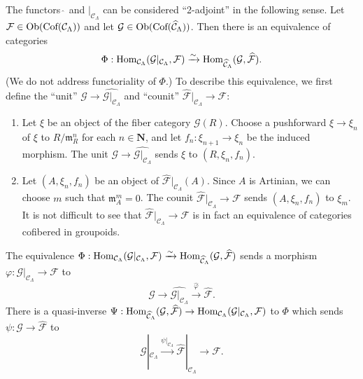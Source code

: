 \begin{remark}
\medskip \noindent
The functors $\widehat{~}$ and $|_{\mathcal C_{\Lambda}}$ can be considered 
``2-adjoint'' in the following sense.  Let $\mathcal F \in 
\textnormal{Ob}(\textnormal{Cof}(\mathcal C_{\Lambda}))$ and let $\mathcal G 
\in \textnormal{Ob}(\textnormal{Cof}(\widehat{\mathcal C}_{\Lambda}))$.  Then 
there is an equivalence of categories
\[ 
\Phi: \textnormal{Hom}_{\mathcal C_{\Lambda}}(\mathcal G|_{\mathcal 
C_{\Lambda}}, \mathcal F) 
\xrightarrow{\sim} 
\textnormal{Hom}_{\widehat{\mathcal C}_{\Lambda}}(\mathcal G, \widehat{\mathcal 
F}) .
\]
(We do not address functoriality of $\Phi$.) To describe this equivalence, we 
first define the ``unit'' $\mathcal G \rightarrow \widehat{\mathcal 
G|_{\mathcal C_{\Lambda}}}$ and ``counit'' $\widehat{\mathcal F}|_{\mathcal 
C_{\Lambda}} \rightarrow \mathcal F$:
\begin{enumerate}
\item Let $\xi$ be an object of the fiber category $\mathcal G(R)$.  Choose a 
pushforward $\xi \rightarrow \xi_{n}$ of $\xi$ to $R/\mathfrak{m}_{R}^{n}$ for 
each $n \in \mathbf{N}$, and let $f_{n}: \xi_{n+1} \rightarrow \xi_{n}$ be the 
induced morphism.  The unit $\mathcal G \rightarrow \widehat{\mathcal 
G|_{\mathcal C_{\Lambda}}}$ sends $\xi$ to $(R,\xi_{n},f_{n})$.  
\item Let $(A,\xi_n,f_n)$ be an object of $\widehat{\mathcal F}|_{\mathcal 
C_{\Lambda}}(A)$. Since $A$ is Artinian, we can choose $m$ such that 
$\mathfrak{m}_{A}^{m} = 0$.  The counit $\widehat{\mathcal F}|_{\mathcal 
C_{\Lambda}} \rightarrow \mathcal F$ sends $(A,\xi_n,f_n)$ to $\xi_{m}$.  It is 
not difficult to see that $\widehat{\mathcal F}|_{\mathcal C_{\Lambda}} 
\rightarrow \mathcal F$ is in fact an equivalence of categories cofibered in 
groupoids.
\end{enumerate}
The equivalence $\Phi: \textnormal{Hom}_{\mathcal C_{\Lambda}}(\mathcal 
G|_{\mathcal C_{\Lambda}}, \mathcal F) 
\xrightarrow{\sim} 
\textnormal{Hom}_{\widehat{\mathcal C}_{\Lambda}}(\mathcal G, \widehat{\mathcal 
F})$ sends a morphism $\varphi: \mathcal G|_{\mathcal C_{\Lambda}} \rightarrow 
\mathcal F$ to
\[ \mathcal G \rightarrow \widehat{\mathcal G|_{\mathcal C_{\Lambda}}} 
\xrightarrow{\widehat{\varphi}} \widehat{\mathcal F} .\]
There is a quasi-inverse $\Psi: \textnormal{Hom}_{\widehat{\mathcal 
C}_{\Lambda}}(\mathcal G, \widehat{\mathcal F}) \rightarrow 
\textnormal{Hom}_{\mathcal C_{\Lambda}}(\mathcal G|_{\mathcal C_{\Lambda}}, 
\mathcal F)$ to $\Phi$ which sends $\psi: \mathcal G \rightarrow 
\widehat{\mathcal F}$ to
\[ \mathcal G|_{\mathcal C_{\Lambda}} \xrightarrow{\psi|_{\mathcal 
C_{\Lambda}}} \widehat{\mathcal F}|_{\mathcal C_{\Lambda}} \rightarrow \mathcal 
F.\]
\end{remark}

